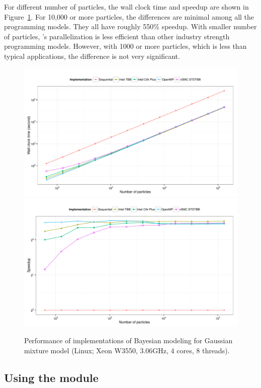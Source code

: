 For different number of particles, the wall clock time and speedup are shown
in Figure~\ref{fig:bench-smp-perf}. For 10,000 or more particles, the
differences are minimal among all the programming models. They all have
roughly 550\% speedup. With smaller number of particles, \vsmc's \cppoo
parallelization is less efficient than other industry strength programming
models. However, with 1000 or more particles, which is less than typical
applications, the difference is not very significant.

\begin{figure}
  \centering
  \includegraphics[width=\linewidth]{fig/bench-smp-time-running}
  \includegraphics[width=\linewidth]{fig/bench-smp-speedup-running}
  \caption[Performance of \protect\vsmc \protect\smp implementations]
  {Performance of \cpp implementations of Bayesian modeling for
    Gaussian mixture model (Linux; Xeon W3550, 3.06GHz, 4 cores, 8 threads).}
  \label{fig:bench-smp-perf}
\end{figure}

\subsection{Using the \protect\opencl module}
\label{sub:Using the OpenCL module}

